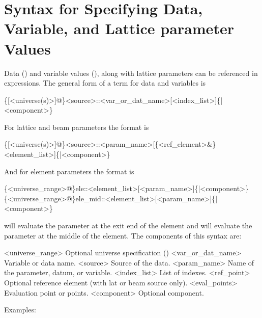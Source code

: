 \section{Syntax for Specifying Data, Variable, and Lattice parameter Values}
\label{s:param.syntax}

Data () and variable values
(), along with lattice parameters can be
referenced in expressions. The general form of a term for
data and variables is
\begin{example}
  \{[<universe(s)>]@\}<source>::<var_or_dat_name>[<index_list>]\{|<component>\}
\end{example}
For lattice and beam parameters the format is
\begin{example}
  \{[<universe(s)>]@\}<source>::<param_name>[\{<ref_element>&\}<element_list>]\{|<component>\}
\end{example}
And for element parameters the format is
\begin{example}
  \{<universe_range>@\}ele::<element_list>[<param_name>]\{|<component>\}
  \{<universe_range>@\}ele_mid::<element_list>[<param_name>]\{|<component>\}
\end{example}
 will evaluate the parameter at the exit end of the element and 
 will evaluate the parameter at the middle of the element.
The components of this syntax are:
\begin{example}
  <universe_range>    Optional universe specification ()
  <var_or_dat_name>   Variable or data name.
  <source>            Source of the data.
  <param_name>        Name of the parameter, datum, or variable.
  <index_list>        List of indexes.
  <ref_point>         Optional reference element (with lat or beam source only).
  <eval_points>       Evaluation point or points.
  <component>         Optional component. 
\end{example}
Examples:

